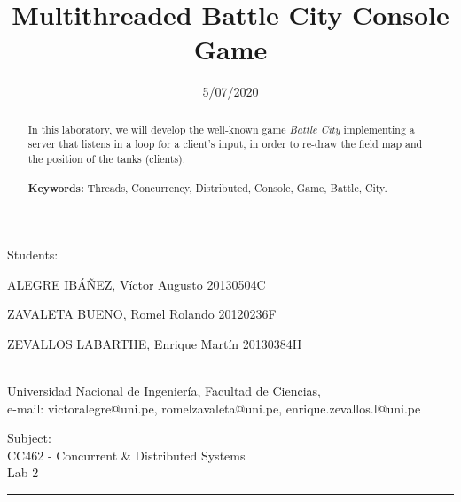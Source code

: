 \documentclass[10pt,a4paper]{article}
\theoremstyle{definition}
\begin{document}
	
\title{Multithreaded Battle City Console Game}
\date{5/07/2020}
\maketitle

\begin{center}
	Students:\\
	\vspace{5pt}
	{\large ALEGRE IBÁÑEZ, Víctor Augusto 20130504C

ZAVALETA BUENO, Romel Rolando 20120236F

ZEVALLOS LABARTHE, Enrique Martín 20130384H}\\
	Universidad Nacional de Ingenier\'ia, Facultad de Ciencias,\\
	e-mail: victoralegre@uni.pe, romelzavaleta@uni.pe, enrique.zevallos.l@uni.pe
	
\end{center}
\vspace{5pt}
\begin{center}
	Subject:\\
	\vspace{5pt}
	{\large CC462 - Concurrent \& Distributed Systems
}\\
	{\large Lab 2}\\
	

	
\end{center}
\vspace{20pt}
\begin{abstract}
{\small
\hspace*{0.5cm}
In this laboratory, we will develop the well-known game \textit{Battle City} implementing a server that listens in a loop for a client's input, in order to re-draw the field map and the position of the tanks (clients).\\\\
\textbf{Keywords:} Threads, Concurrency, Distributed, Console, Game, Battle, City.
}
\end{abstract}




\tableofcontents

\vspace{20pt}
\hrule
\vspace{10pt}
\end{document}
